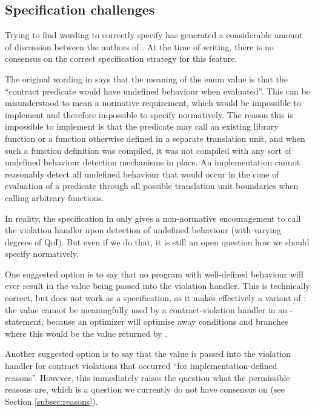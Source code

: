 \subsection{Specification challenges}

Trying to find wording to correctly specify \mbox{} has generated a considerable amount of discussion between the authors of \cite{P2900R4}. At the time of writing, there is no consensus on the correct specification strategy for this feature.

The original wording in \cite{P2811R5} says that the meaning of the enum value is that the “contract predicate would have undefined behaviour when evaluated”. This can be misunderstood to mean a normative requirement, which would be impossible to implement and therefore impossible to specify normatively. The reason this is impossible to implement is that the predicate may call an existing library function or a function otherwise defined in a separate translation unit, and when such a function definition was compiled, it was not compiled with any sort of undefined behaviour detection mechanisms in place. An implementation cannot reasonably detect all undefined behaviour that would occur in the cone of evaluation of a predicate through all possible translation unit boundaries when calling arbitrary functions.

In reality, the specification in \cite{P2811R5} only gives a non-normative encouragement to call the violation handler upon detection of undefined behaviour (with varying degrees of QoI). But even if we do that, it is still an open question how we should specify \mbox{} normatively.

One suggested option is to say that no program with well-defined behaviour will ever result in the value \mbox{} being passed into the violation handler. This is technically correct, but does not work as a specification, as it makes  \mbox{} effectively a variant of : the value cannot be meaningfully used by a contract-violation handler in an -statement, because an optimizer will optimise away conditions and branches where this would be the value returned by .

Another suggested option is to say that the value \mbox{} is passed into the violation handler for contract violations that occurred ``for implementation-defined reasons''. However, this immediately raises the question what the permissible reasons are, which is a question we currently do not have consensus on (see Section \ref{subsec:reasons}).


